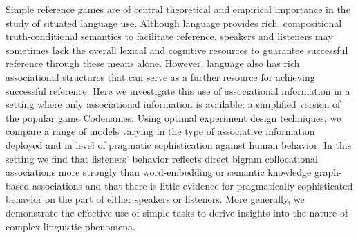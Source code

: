 Simple reference games are of central theoretical and empirical importance in the study of situated language use.  Although language provides rich, compositional truth-conditional semantics to facilitate reference, speakers and listeners may sometimes lack the overall lexical and cognitive resources to guarantee successful reference through these means alone.  However, language also has rich associational structures that can serve as a further resource for achieving successful reference. Here we investigate this use of associational information in a setting where only associational information is available: a simplified version of the popular game Codenames. Using optimal experiment design techniques, we compare a range of models varying in the type of associative information deployed and in level of pragmatic sophistication against human behavior.  In this setting we find that listeners' behavior reflects direct bigram collocational associations more strongly than word-embedding or semantic knowledge graph-based associations and that there is little evidence for pragmatically sophisticated behavior on the part of either speakers or listeners. More generally, we demonstrate the effective use of simple tasks to derive insights into the nature of complex linguistic phenomena.
